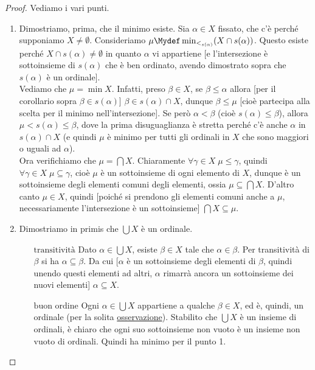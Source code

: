 \documentclass[11pt]{scrartcl}
\begin{document}
\begin{proof}
	Vediamo i vari punti.
	\begin{enumerate}[1.]
		\item Dimostriamo, prima, che il minimo esiste. Sia $\alpha \in X$ fissato, che c'è perché supponiamo $X \ne \emptyset$. Consideriamo $\mu \Mydef \min_{<_{s(\alpha)}}(X \cap s(\alpha))$.
		Questo esiste perché $X \cap s(\alpha) \ne \emptyset$ in quanto $\alpha$ vi appartiene [e l'intersezione è sottoinsieme di $s(\alpha)$ che è ben ordinato, avendo dimostrato sopra che $s(\alpha)$ è un ordinale].\\
		Vediamo che $\mu = \min X$. Infatti, preso $\beta \in X$, se $\beta \leq \alpha$ allora [per il corollario sopra $\beta \in s(\alpha)$] $\beta \in s(\alpha) \cap X$, dunque $\beta \leq \mu$ [cioè partecipa alla scelta per il minimo nell'intersezione]. Se però $\alpha < \beta$ (cioè $s(\alpha) \leq \beta$), allora 
		$\mu < s(\alpha) \leq \beta$, dove la prima disuguaglianza è stretta perché c'è anche $\alpha$ in $s(\alpha) \cap X$ (e quindi $\mu$ è minimo per tutti gli ordinali in $X$ che sono maggiori o uguali ad $\alpha$).\\
		Ora verifichiamo che $\mu = \bigcap X$. Chiaramente $\forall \gamma \in X \; \mu \leq \gamma$, quindi $\forall \gamma \in X \; \mu \subseteq \gamma$, cioè $\mu$ è un sottoinsieme di ogni elemento di $X$, dunque è un sottoinsieme degli elementi comuni degli elementi, ossia $\mu \subseteq \bigcap X$. D'altro
		canto $\mu \in X$, quindi [poiché si prendono gli elementi comuni anche a $\mu$, necessariamente l'intersezione è un sottoinsieme] $\bigcap X \subseteq \mu$.
		\item Dimostriamo in primis che $\bigcup X$ è un ordinale.
		\begin{itemize}
			\item[$\boxed{\text{transitività}}$] Dato $\alpha \in \bigcup X$, esiste $\beta \in X$ tale che $\alpha \in \beta$. Per transitività di $\beta$ si ha $\alpha \subseteq\beta$. Da cui [$\alpha$ è un sottoinsieme degli elementi di $\beta$, quindi unendo questi elementi ad altri, $\alpha$ rimarrà ancora un sottoinsieme dei nuovi elementi] $\alpha \subseteq X$.
			\item[$\boxed{\text{buon ordine}}$] Ogni $\alpha \in \bigcup X$ appartiene a qualche $\beta \in X$, ed è, quindi, un ordinale (per la solita \hyperref[Ord_trans]{osservazione}). Stabilito che $\bigcup X$ è un insieme di ordinali, è chiaro che ogni suo sottoinsieme non vuoto è un insieme non vuoto di ordinali. Quindi ha minimo per il punto 1.

\end{itemize}
\end{enumerate}
\end{proof}
\end{document}
